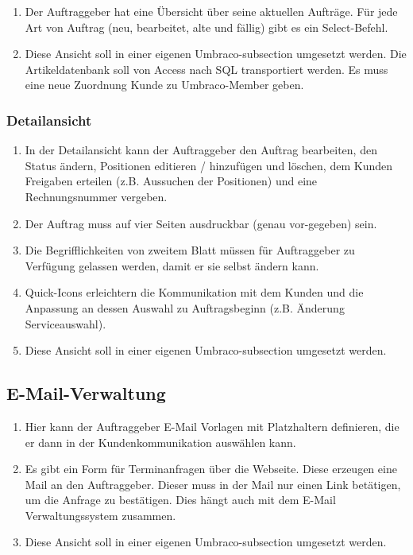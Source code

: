 \begin{enumerate}
	\item Der Auftraggeber hat eine Übersicht über seine aktuellen Aufträge. Für jede Art von Auftrag (neu, bearbeitet, alte und fällig) gibt es ein Select-Befehl.
	\item Diese Ansicht soll in einer eigenen Umbraco-subsection umgesetzt werden. Die Artikeldatenbank soll von Access nach SQL transportiert werden. Es muss eine neue Zuordnung Kunde zu Umbraco-Member geben.
\end{enumerate} 



\subsubsection{Detailansicht}

\begin{enumerate}
	\item In der Detailansicht kann der Auftraggeber den Auftrag bearbeiten, den Status ändern, Positionen editieren / hinzufügen und löschen, dem Kunden Freigaben erteilen (z.B. Aussuchen der Positionen) und eine Rechnungsnummer vergeben.
	\item Der Auftrag muss auf vier Seiten ausdruckbar (genau vor-gegeben) sein.
	\item Die Begrifflichkeiten von zweitem Blatt müssen für Auftraggeber zu Verfügung gelassen werden, damit er sie selbst ändern kann.
	\item Quick-Icons erleichtern die Kommunikation mit dem Kunden und die Anpassung an dessen Auswahl zu Auftragsbeginn (z.B. Änderung Serviceauswahl).
	\item  Diese Ansicht soll in einer eigenen Umbraco-subsection umgesetzt werden.
\end{enumerate} 


\subsection{E-Mail-Verwaltung}

\begin{enumerate}
	\item Hier kann der Auftraggeber E-Mail Vorlagen mit Platzhaltern definieren, die er dann in der Kundenkommunikation auswählen kann.
	\item Es gibt ein Form für Terminanfragen über die Webseite. Diese erzeugen eine Mail an den Auftraggeber. Dieser muss in der Mail nur einen Link betätigen, um die Anfrage zu bestätigen. Dies hängt auch mit dem E-Mail Verwaltungssystem zusammen.
	\item Diese Ansicht soll in einer eigenen Umbraco-subsection umgesetzt werden.
\end{enumerate} 




